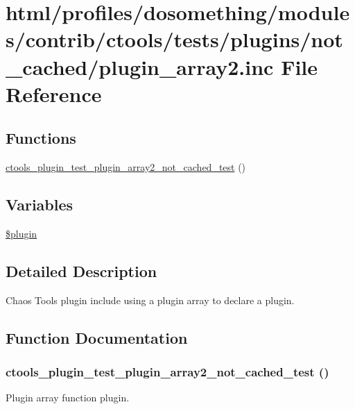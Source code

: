 \hypertarget{not__cached_2plugin__array2_8inc}{
\section{html/profiles/dosomething/modules/contrib/ctools/tests/plugins/not\_\-cached/plugin\_\-array2.inc File Reference}
\label{not__cached_2plugin__array2_8inc}
}
\subsection*{Functions}
\begin{DoxyCompactItemize}
\item 
\hyperlink{not__cached_2plugin__array2_8inc_ae684efbdd777a435ce12ab90d5b0472f}{ctools\_\-plugin\_\-test\_\-plugin\_\-array2\_\-not\_\-cached\_\-test} ()
\end{DoxyCompactItemize}
\subsection*{Variables}
\begin{DoxyCompactItemize}
\item 
\hyperlink{not__cached_2plugin__array2_8inc_ada8a7130088351710bb02ed622d6bf65}{\$plugin}
\end{DoxyCompactItemize}


\subsection{Detailed Description}
Chaos Tools plugin include using a plugin array to declare a plugin. 

\subsection{Function Documentation}
\hypertarget{not__cached_2plugin__array2_8inc_ae684efbdd777a435ce12ab90d5b0472f}{
\subsubsection[{ctools\_\-plugin\_\-test\_\-plugin\_\-array2\_\-not\_\-cached\_\-test}]{\setlength{\rightskip}{0pt plus 5cm}ctools\_\-plugin\_\-test\_\-plugin\_\-array2\_\-not\_\-cached\_\-test ()}}
\label{not__cached_2plugin__array2_8inc_ae684efbdd777a435ce12ab90d5b0472f}
Plugin array function plugin. 

